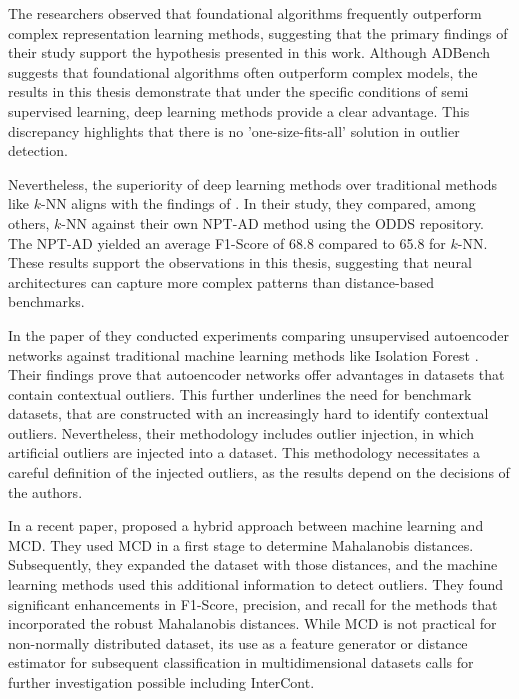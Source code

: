 The researchers observed that foundational algorithms frequently outperform complex representation learning methods, suggesting that the primary findings of their study support the hypothesis presented in this work. 
Although ADBench suggests that foundational algorithms often outperform complex models, the results in this thesis demonstrate that under the specific conditions of semi supervised learning, deep learning methods provide a clear advantage. 
This discrepancy highlights that there is no 'one-size-fits-all' solution in outlier detection.


Nevertheless, the superiority of deep learning methods over traditional methods like $k$-NN aligns with the findings of \citet{thimonier2023beyond}. 
In their study, they compared, among others, $k$-NN against their own NPT-AD method using the ODDS repository. 
The NPT-AD yielded an average F1-Score of 68.8 compared to 65.8 for $k$-NN. 
These results support the observations in this thesis, suggesting that neural architectures can capture more complex patterns than distance-based benchmarks.


In the paper of \citet{schindler2023towards} they conducted experiments comparing unsupervised autoencoder networks against traditional machine learning methods like Isolation Forest \citep{liu2008isolation}. 
Their findings prove that autoencoder networks offer advantages in datasets that contain contextual outliers. 
This further underlines the need for benchmark datasets, that are constructed with an increasingly hard to identify contextual outliers.
Nevertheless, their methodology includes outlier injection, in which artificial outliers are injected into a dataset. 
This methodology necessitates a careful definition of the injected outliers, as the results depend on the decisions of the authors. 


In a recent paper, \citet{shrivastava2023anomaly} proposed a hybrid approach between machine learning and MCD. 
They used MCD in a first stage to determine Mahalanobis distances. 
Subsequently, they expanded the dataset with those distances, and the machine learning methods used this additional information to detect outliers. 
They found significant enhancements in F1-Score, precision, and recall for the methods that incorporated the robust Mahalanobis distances.
While MCD is not practical for non-normally distributed dataset, its use as a feature generator or distance estimator for subsequent classification in multidimensional datasets calls for further investigation possible including InterCont. 



